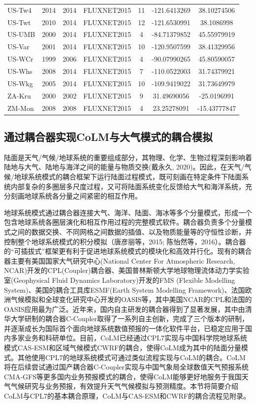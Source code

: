 \begin{center}
\begin{longtable}{lcccccc}
US-Tw4 & 2014 & 2014 & FLUXNET2015 & 11     & -121.6413269 & 38.10274506  \\
US-Twt & 2010 & 2014 & FLUXNET2015 & 12     & -121.6530991 & 38.1086998   \\
US-UMB & 2000 & 2014 & FLUXNET2015 & 4      & -84.71379852 & 45.55979919  \\
US-Var & 2001 & 2014 & FLUXNET2015 & 10     & -120.9507599 & 38.41329956  \\
US-WCr & 1999 & 2006 & FLUXNET2015 & 4      & -90.07990265 & 45.80590057  \\
US-Whs & 2008 & 2014 & FLUXNET2015 & 7      & -110.0522003 & 31.74379921  \\
US-Wkg & 2005 & 2014 & FLUXNET2015 & 10     & -109.9419022 & 31.73649979  \\
ZA-Kru & 2000 & 2002 & FLUXNET2015 & 9      & 31.49690056  & -25.0196991  \\
ZM-Mon & 2008 & 2008 & FLUXNET2015 & 4      & 23.25278091  & -15.43777847 \\ 
\end{longtable}
\end{center}


\subsection{通过耦合器实现CoLM与大气模式的耦合模拟}\label{CoLM与大气模式耦合}
陆面是天气/气候/地球系统的重要组成部分，其物理、化学、生物过程深刻影响着陆地与大气、陆地与海洋之间的能量与物质交换(戴永久, 2020)。因此，在天气/气候/地球系统模式的耦合框架下运行陆面过程模式，既可刻画在特定条件下陆面系统内部复杂的多圈层多尺度过程，又可将陆面系统变化反馈给大气和海洋系统，充分刻画地球系统各分量之间紧密的相互作用。

地球系统模式通过耦合器连接大气、海洋、陆面、海冰等多个分量模式，形成一个包含地球系统各圈层演化和相互作用过程的完整模式软件。耦合器负责多个分量模式之间的数据交换、不同网格之间数据的插值、以及物质能量等的守恒性诊断，并控制整个地球系统模式的积分模拟（唐彦丽等，2015; 陈怡然等，2016）。耦合器的“可插拔式”框架更有利于促进地球系统模式的模块化和高效并行化。现有的耦合器主要有美国国家大气研究中心(National Center For Atmospheric Research, NCAR)开发的CPL(Coupler)耦合器、美国普林斯顿大学地球物理流体动力学实验室(Geophysical Fluid Dynamics Laboratory)开发的FMS (Flexible Modelling System)、美国的耦合工具库ESMF(Earth System Modelling Framework)、法国欧洲气候模拟和全球变化研究中心开发的OASIS等，其中美国NCAR的CPL和法国的OASIS应用最为广泛。近年来，国内自主研发的耦合器得到了显著发展，其中由清华大学研制的耦合器C-Coupler取得了一系列自主创新，完成了三个版本的研制，并逐渐成长为国际首个面向地球系统数值预报的一体化软件平台，已稳定应用于国内多家业务和科研单位。目前，CoLM已经通过CPL7实现与中国科学院地球系统模式CAS-ESM和区域气候模式CWRF的耦合，使得CoLM成为其中的陆面分量模式。其他使用CPL7的地球系统模式可通过类似流程实现与CoLM的耦合。CoLM将在后续尝试通过国产耦合器C-Coupler实现与中国气象局全球数值天气预报系统CMA-GFS等更多国内业务预报模式的耦合，使得CoLM能够更好地服务于我国天气气候研究与业务预报，有效提升天气气候模拟与预测精度。本节将简要介绍CoLM与CPL7的基本耦合原理，CoLM与CAS-ESM和CWRF的耦合流程见附录。

